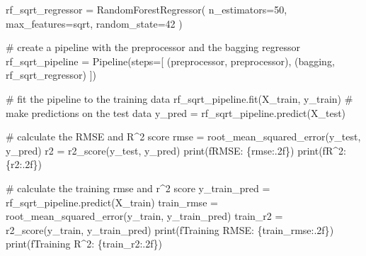 \documentclass[
  letterpaper,
  DIV=11,
  numbers=noendperiod]{scrreprt}
\newenvironment{Shaded}{\begin{snugshade}}{\end{snugshade}}
\newcommand{\BuiltInTok}[1]{\textcolor[rgb]{0.00,0.23,0.31}{#1}}
\newcommand{\CommentTok}[1]{\textcolor[rgb]{0.37,0.37,0.37}{#1}}
\newcommand{\DecValTok}[1]{\textcolor[rgb]{0.68,0.00,0.00}{#1}}
\newcommand{\NormalTok}[1]{\textcolor[rgb]{0.00,0.23,0.31}{#1}}
\newcommand{\OperatorTok}[1]{\textcolor[rgb]{0.37,0.37,0.37}{#1}}
\newcommand{\SpecialCharTok}[1]{\textcolor[rgb]{0.37,0.37,0.37}{#1}}
\newcommand{\SpecialStringTok}[1]{\textcolor[rgb]{0.13,0.47,0.30}{#1}}
\newcommand{\StringTok}[1]{\textcolor[rgb]{0.13,0.47,0.30}{#1}}
\begin{document}
\begin{Shaded}
\begin{Highlighting}[]
\NormalTok{rf\_sqrt\_regressor }\OperatorTok{=}\NormalTok{ RandomForestRegressor(}
\NormalTok{    n\_estimators}\OperatorTok{=}\DecValTok{50}\NormalTok{,}
\NormalTok{    max\_features}\OperatorTok{=}\StringTok{\textquotesingle{}sqrt\textquotesingle{}}\NormalTok{,}
\NormalTok{    random\_state}\OperatorTok{=}\DecValTok{42}
\NormalTok{)}

\CommentTok{\# create a pipeline with the preprocessor and the bagging regressor}
\NormalTok{rf\_sqrt\_pipeline }\OperatorTok{=}\NormalTok{ Pipeline(steps}\OperatorTok{=}\NormalTok{[}
\NormalTok{    (}\StringTok{\textquotesingle{}preprocessor\textquotesingle{}}\NormalTok{, preprocessor),}
\NormalTok{    (}\StringTok{\textquotesingle{}bagging\textquotesingle{}}\NormalTok{, rf\_sqrt\_regressor)}
\NormalTok{])}

\CommentTok{\# fit the pipeline to the training data}
\NormalTok{rf\_sqrt\_pipeline.fit(X\_train, y\_train)}
\CommentTok{\# make predictions on the test data}
\NormalTok{y\_pred }\OperatorTok{=}\NormalTok{ rf\_sqrt\_pipeline.predict(X\_test)}

\CommentTok{\# calculate the RMSE and R\^{}2 score}
\NormalTok{rmse }\OperatorTok{=}\NormalTok{ root\_mean\_squared\_error(y\_test, y\_pred)}
\NormalTok{r2 }\OperatorTok{=}\NormalTok{ r2\_score(y\_test, y\_pred)}
\BuiltInTok{print}\NormalTok{(}\SpecialStringTok{f\textquotesingle{}RMSE: }\SpecialCharTok{\{}\NormalTok{rmse}\SpecialCharTok{:.2f\}}\SpecialStringTok{\textquotesingle{}}\NormalTok{)}
\BuiltInTok{print}\NormalTok{(}\SpecialStringTok{f\textquotesingle{}R\^{}2: }\SpecialCharTok{\{}\NormalTok{r2}\SpecialCharTok{:.2f\}}\SpecialStringTok{\textquotesingle{}}\NormalTok{)}

\CommentTok{\# calculate the training rmse and r\^{}2 score}
\NormalTok{y\_train\_pred }\OperatorTok{=}\NormalTok{ rf\_sqrt\_pipeline.predict(X\_train)}
\NormalTok{train\_rmse }\OperatorTok{=}\NormalTok{ root\_mean\_squared\_error(y\_train, y\_train\_pred)}
\NormalTok{train\_r2 }\OperatorTok{=}\NormalTok{ r2\_score(y\_train, y\_train\_pred)}
\BuiltInTok{print}\NormalTok{(}\SpecialStringTok{f\textquotesingle{}Training RMSE: }\SpecialCharTok{\{}\NormalTok{train\_rmse}\SpecialCharTok{:.2f\}}\SpecialStringTok{\textquotesingle{}}\NormalTok{)}
\BuiltInTok{print}\NormalTok{(}\SpecialStringTok{f\textquotesingle{}Training R\^{}2: }\SpecialCharTok{\{}\NormalTok{train\_r2}\SpecialCharTok{:.2f\}}\SpecialStringTok{\textquotesingle{}}\NormalTok{)}

\end{Highlighting}
\end{Shaded}
\end{document}
